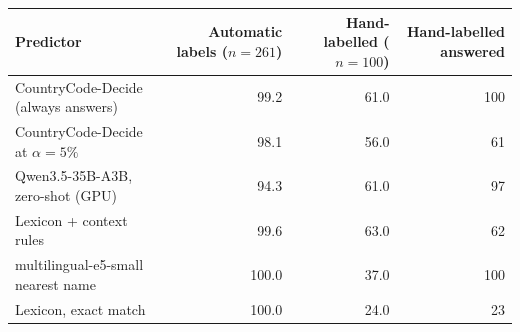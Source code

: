\begin{tabular}{lrrr}
\toprule
Predictor & Automatic labels ($n=261$) & Hand-labelled ($n=100$) & Hand-labelled answered \\
\midrule
CountryCode-Decide (always answers) & 99.2 & 61.0 & 100 \\
CountryCode-Decide at $\alpha = 5\%$ & 98.1 & 56.0 & 61 \\
Qwen3.5-35B-A3B, zero-shot (GPU) & 94.3 & 61.0 & 97 \\
Lexicon + context rules & 99.6 & 63.0 & 62 \\
multilingual-e5-small nearest name & 100.0 & 37.0 & 100 \\
Lexicon, exact match & 100.0 & 24.0 & 23 \\
\bottomrule
\end{tabular}
